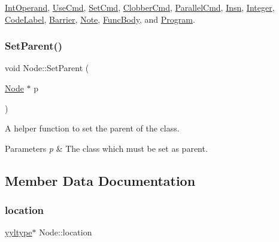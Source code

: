 \hyperlink{class_int_operand_ac3a3845a17a1eb9a2c1e3ff631b8a400}{Int\+Operand}, \hyperlink{class_use_cmd_ae8b6bad04d432107afa86f5b6ab98db9}{Use\+Cmd}, \hyperlink{class_set_cmd_ac06d57c11b7c92f3e4b3f94c7a889166}{Set\+Cmd}, \hyperlink{class_clobber_cmd_a45fe80d35161dd6a32ed5d36bd07a5ca}{Clobber\+Cmd}, \hyperlink{class_parallel_cmd_a03464113f3eca068ca4d0fd120cb27cc}{Parallel\+Cmd}, \hyperlink{class_insn_aa0717beb7970d93fa733ffa41b7629ac}{Insn}, \hyperlink{class_integer_ac4122c2a26fe8825c4c3123f217a4021}{Integer}, \hyperlink{class_code_label_a982af1b687ea06a189a87f49a50fdf93}{Code\+Label}, \hyperlink{class_barrier_a4210ab976223e77243f019045f0f3875}{Barrier}, \hyperlink{class_note_ae922da0a006d207db5e141dcade6032e}{Note}, \hyperlink{class_func_body_a6e42023a04da72f19901550f910b2e35}{Func\+Body}, and \hyperlink{class_program_a70520a269a65d735e10c6f28acf075ad}{Program}.

\mbox{\label{class_node_ac8f490bfdc412494ac4793e36ecf3a16}} 
\subsubsection{\texorpdfstring{Set\+Parent()}{SetParent()}}
{\footnotesize\ttfamily void Node\+::\+Set\+Parent (\begin{DoxyParamCaption}\item[{\hyperlink{class_node}{Node} $\ast$}]{p }\end{DoxyParamCaption})\hspace{0.3cm}{\ttfamily [inline]}}

A helper function to set the parent of the class. 
\begin{DoxyParams}{Parameters}
{\em p} & The class which must be set as parent. \\
\hline
\end{DoxyParams}


\subsection{Member Data Documentation}
\mbox{\label{class_node_aa4d56e7ecdd3fd9c483b2309af3e9abf}} 
\subsubsection{\texorpdfstring{location}{location}}
{\footnotesize\ttfamily \hyperlink{structyyltype}{yyltype}$\ast$ Node\+::location\hspace{0.3cm}{\ttfamily [protected]}}


